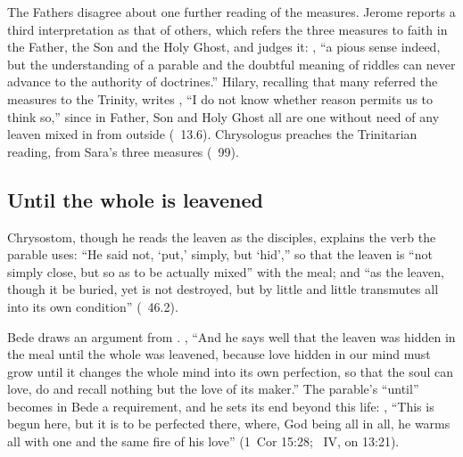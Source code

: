 The Fathers disagree about one further reading of the measures. Jerome
reports a third interpretation as that of others, which refers the three
measures to faith in the Father, the Son and the Holy Ghost, and judges it:
, ``a pious sense
indeed, but the understanding of a parable and the doubtful meaning of
riddles can never advance to the authority of doctrines.'' Hilary, recalling
that many referred the measures to the Trinity, writes , ``I do not know whether reason permits us to think
so,'' since in Father, Son and Holy Ghost all are one without need of any
leaven mixed in from outside (~13.6). Chrysologus preaches
the Trinitarian reading, from Sara's three measures (~99).

\subsection{Until the whole is leavened}
\label{sec:leaven-donec}

Chrysostom, though he reads the leaven as the disciples, explains the verb
the parable uses: ``He said not, `put,' simply, but `hid','' so that the
leaven is ``not simply close, but so as to be actually mixed'' with the meal;
and ``as the leaven, though it be buried, yet is not destroyed, but by little
and little transmutes all into its own condition'' (~46.2).

Bede draws an argument from . , ``And he says well that
the leaven was hidden in the meal until the whole was leavened, because love
hidden in our mind must grow until it changes the whole mind into its own
perfection, so that the soul can love, do and recall nothing but the love of
its maker.'' The parable's ``until'' becomes in Bede a requirement, and he
sets its end beyond this life: , ``This is begun here, but it is to be perfected there, where, God
being all in all, he warms all with one and the same fire of his love'' (1~Cor
15:28; ~IV, on 13:21).

